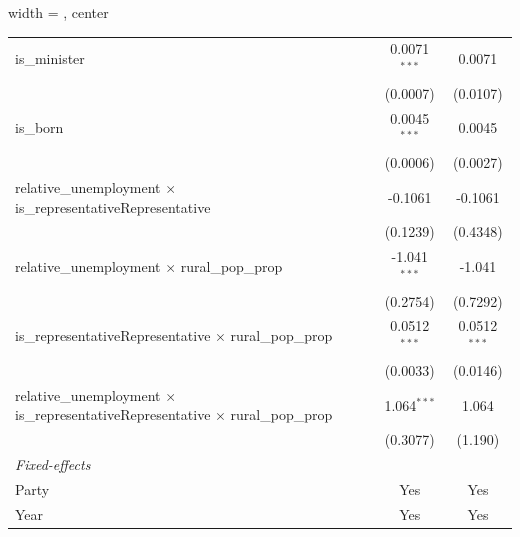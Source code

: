 \begin{adjustbox}{width = \textwidth, center}
\begin{tabular}{lcc}
      is\_minister                                                                                     & 0.0071$^{***}$          & 0.0071\\   
                                                                                                       & (0.0007)                & (0.0107)\\   
      is\_born                                                                                         & 0.0045$^{***}$          & 0.0045\\   
                                                                                                       & (0.0006)                & (0.0027)\\   
      relative\_unemployment $\times$ is\_representativeRepresentative                                 & -0.1061                 & -0.1061\\   
                                                                                                       & (0.1239)                & (0.4348)\\   
      relative\_unemployment $\times$ rural\_pop\_prop                                                 & -1.041$^{***}$          & -1.041\\   
                                                                                                       & (0.2754)                & (0.7292)\\   
      is\_representativeRepresentative $\times$ rural\_pop\_prop                                       & 0.0512$^{***}$          & 0.0512$^{***}$\\   
                                                                                                       & (0.0033)                & (0.0146)\\   
      relative\_unemployment $\times$ is\_representativeRepresentative $\times$ rural\_pop\_prop       & 1.064$^{***}$           & 1.064\\   
                                                                                                       & (0.3077)                & (1.190)\\   
      \midrule
      \emph{Fixed-effects}\\
      Party                                                                                            & Yes                     & Yes\\  
      Year                                                                                             & Yes                     & Yes\\  

\end{tabular}
\end{adjustbox}
